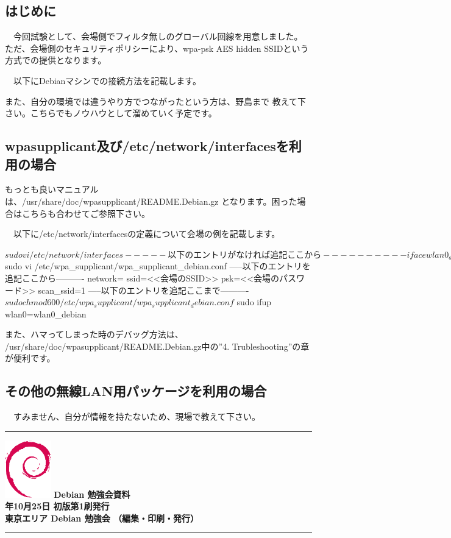 \documentclass[mingoth,a4paper]{jsarticle}
\newcommand{\debmtgyear}{2014}
\newcommand{\debmtgmonth}{10}
\newcommand{\debmtgdate}{25}
\begin{document}
 \subsection{はじめに}

　今回試験として、会場側でフィルタ無しのグローバル回線を用意しました。
ただ、会場側のセキュリティポリシーにより、wpa-psk AES hidden SSIDという
方式での提供となります。

　以下にDebianマシンでの接続方法を記載します。

 また、自分の環境では違うやり方でつながったという方は、野島まで
教えて下さい。こちらでもノウハウとして溜めていく予定です。

 \subsection{wpasupplicant及び/etc/network/interfacesを利用の場合}

 もっとも良いマニュアルは、/usr/share/doc/wpasupplicant/README.Debian.gz
となります。困った場合はこちらも合わせてご参照下さい。

　以下に/etc/network/interfacesの定義について会場の例を記載します。

\begin{commandline}
$ sudo vi /etc/network/interfaces
-----以下のエントリがなければ追記ここから----------
iface wlan0_debian inet dhcp
     wpa-conf /etc/wpa_supplicant/wpa_supplicant_debian.conf
-----以下のエントリがなければ追記ここまで----------
$ sudo vi /etc/wpa_supplicant/wpa_supplicant_debian.conf
-----以下のエントリを追記ここから----------
network={
     ssid=<<会場のSSID>>
     psk=<<会場のパスワード>>
     scan_ssid=1
}
-----以下のエントリを追記ここまで----------
$ sudo chmod 600 /etc/wpa_supplicant/wpa_supplicant_debian.conf
$ sudo ifup wlan0=wlan0_debian
\end{commandline}

 また、ハマってしまった時のデバッグ方法は、
/usr/share/doc/wpasupplicant/README.Debian.gz中の''4. Trubleshooting''の章が便利です。

 \subsection{その他の無線LAN用パッケージを利用の場合}

　すみません、自分が情報を持たないため、現場で教えて下さい。
 
\cleartooddpage

\vspace*{15cm}
\hrule
\vspace{2mm}
\includegraphics[width=2cm]{image200502/openlogo-nd.eps}
\noindent \Large \bf Debian 勉強会資料\\
\noindent \normalfont \debmtgyear{}年\debmtgmonth{}月\debmtgdate{}日 \hspace{5mm}  初版第1刷発行\\
\noindent \normalfont 東京エリア Debian 勉強会 （編集・印刷・発行）\\
\hrule
\end{document}
